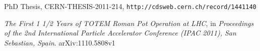 \documentclass[doublecol]{../macros/epl2}
\begin{document}
\begin{thebibliography}{0}
	PhD Thesis, CERN-THESIS-2011-214, {\tt http://cdsweb.cern.ch/record/1441140}

	{\it The First 1 1/2 Years of TOTEM Roman Pot Operation at LHC}, in
	{\it Proceedings of the 2nd International Particle Accelerator Conference (IPAC 2011), San Sebastian, Spain}. 
	arXiv:1110.5808v1
	


%

\end{thebibliography}
\end{document}

